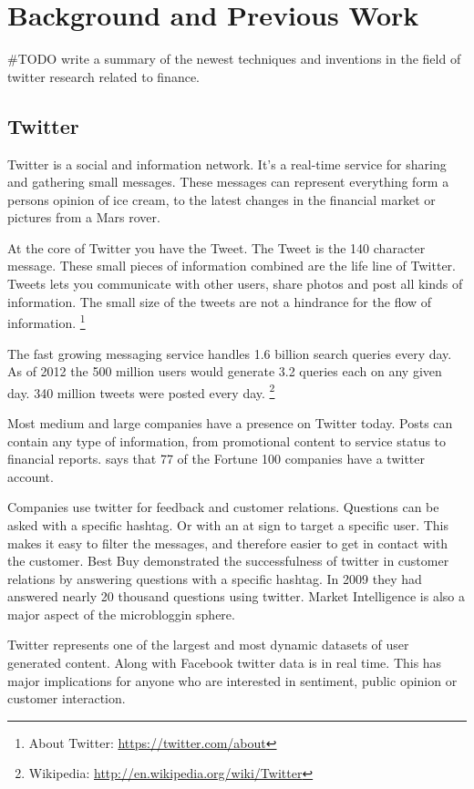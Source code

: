 \chapter{Background and Previous Work}
#TODO write a summary of the newest techniques and inventions in the field of twitter research related to finance. 

\section{Twitter}
Twitter is a social and information network. 
It's a real-time service for sharing and gathering small messages. These
messages can represent everything form a persons opinion of ice cream, to the
latest changes in the financial market or pictures from a Mars rover. 

At the core of Twitter you have the Tweet. The Tweet is the 140 character
message. These small pieces of information combined are the life line of Twitter.
Tweets lets you communicate with other users, share photos and post all kinds of
information. The small size of the tweets are not a hindrance for the flow of
information. 
\footnote{About Twitter: \url{https://twitter.com/about}}

The fast growing messaging service handles 1.6 billion search queries every day.
As of 2012 the 500 million users would generate 3.2 queries each on any given
day. 340 million tweets were posted every day. 
\footnote{Wikipedia: \url{http://en.wikipedia.org/wiki/Twitter}} 

Most medium and large companies have a presence on Twitter today. Posts can contain
any type of information, from promotional content to service status to
financial reports. \cite[p8]{annikajubbega11:twitter_driver_stock_price} says
that 77 of the Fortune 100 companies have a twitter account. 

Companies use twitter for feedback and customer relations. Questions can be
asked with a specific hashtag. Or with an at sign to target a specific user. This makes it easy to filter
the messages, and therefore easier to get in contact with the customer. Best
Buy demonstrated the successfulness of twitter in customer relations by
answering questions with a specific hashtag. In 2009 they had answered nearly
20 thousand questions using twitter. \cite[p1]{Li2013206}
Market Intelligence is also a major aspect of the microbloggin sphere.

Twitter represents one of the largest and most dynamic datasets of user
generated content. Along with Facebook twitter data is in real time. This has major
implications for anyone who are interested in sentiment, public opinion or
customer interaction. \cite[]{sperious11}

